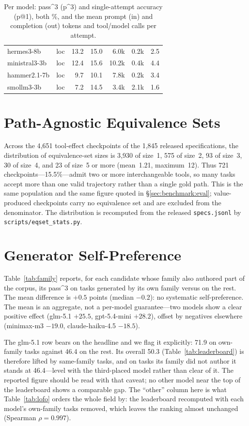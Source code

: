 \begin{table}[h]
\begin{tabular}{llrrrrr}
    hermes3-8b & loc & 13.2 & 15.0 & 6.0k & 0.2k & 2.5 \\
    ministral3-3b & loc & 12.4 & 15.6 & 10.2k & 0.4k & 4.4 \\
    hammer2.1-7b & loc & 9.7 & 10.1 & 7.8k & 0.2k & 3.4 \\
    smollm3-3b & loc & 7.2 & 14.5 & 3.4k & 2.1k & 1.6 \\
    \bottomrule
  \end{tabular}
  \caption{Per model: pass\textasciicircum{}3 (p\textasciicircum{}3) and
    single-attempt accuracy (p@1), both \%, and the mean prompt (in) and
    completion (out) tokens and tool/model calls per attempt.}
  \label{tab:tech}
\end{table}

\section{Path-Agnostic Equivalence Sets}
\label{app:eqset}
Across the 4{,}651 tool-effect checkpoints of the 1{,}845 released
specifications, the distribution of equivalence-set sizes is 3{,}930 of
size~1, 575 of size~2, 93 of size~3, 30 of size~4, and 23 of size~5 or more
(mean~1.21, maximum~12). Thus 721 checkpoints---15.5\%---admit two or more
interchangeable tools, so many tasks accept more than one valid trajectory
rather than a single gold path. This is the same population and the same
figure quoted in \S\ref{sec:benchmark:eval}; value-produced checkpoints carry
no equivalence set and are excluded from the denominator. The distribution is
recomputed from the released \texttt{specs.jsonl} by
\texttt{scripts/eqset\_stats.py}.

\section{Generator Self-Preference}
\label{app:family}
Table~\ref{tab:family} reports, for each candidate whose family also authored
part of the corpus, its pass\textasciicircum{}3 on tasks generated by its own
family versus on the rest. The mean difference is $+0.5$ points (median
$-0.2$): no systematic self-preference. The mean is an aggregate, not a
per-model guarantee---two models show a clear positive effect (glm-5.1
$+25.5$, gpt-5.4-mini $+28.2$), offset by negatives elsewhere (minimax-m3
$-19.0$, claude-haiku-4.5 $-18.5$).

The glm-5.1 row bears on the headline and we flag it explicitly: 71.9 on
own-family tasks against 46.4 on the rest. Its overall 50.3
(Table~\ref{tab:leaderboard}) is therefore lifted by same-family tasks, and on
tasks its family did not author it stands at 46.4---level with the
third-placed model rather than clear of it. The reported figure should be read
with that caveat; no other model near the top of the leaderboard shows a
comparable gap. The ``other'' column here is what
Table~\ref{tab:lofo} orders the whole field by: the leaderboard recomputed with
each model's own-family tasks removed, which leaves the ranking almost
unchanged (Spearman \(\rho = 0.997\)).

